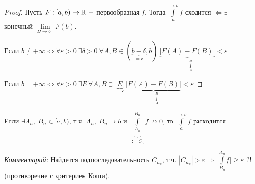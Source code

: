 \begin{proof}
    Пусть $F:[a, b)\rightarrow \mathbb{R}\ -$ первообразная $f$. Тогда $\int\limits_a^{\rightarrow b}f$ сходится $\Leftrightarrow \exists$ конечный $\lim\limits_{B\rightarrow b_-}F(b)$.

    Если $b\neq +\infty \Leftrightarrow \forall \varepsilon >0\ \exists \delta > 0\ \forall A, B\in (\underbrace{b-\delta}_{=c}, b)\ \underbrace{|F(A)-F(B)|}_{=\int\limits_A^B}<\varepsilon$

    Если $b= +\infty \Leftrightarrow \forall \varepsilon >0\ \exists E\ \forall A, B \supset \underbrace{E}_{=c}\ \underbrace{|F(A)-F(B)|}_{=\int\limits_A^B}<\varepsilon$
\end{proof}

\begin{remark}
    Если $\exists A_n,\ B_n\in [a, b)$, т.ч. $A_n,\ B_n\rightarrow b$ и $\underbrace{\int\limits_{A_n}^{B_n}}_{:=C_n}f \not\rightarrow 0$, то $\int\limits_a^{\rightarrow b}f$ расходится.

    \textit{Комментарий:} Найдется подпоследовательность $C_{n_k}$, т.ч. $|C_{n_k}|>\varepsilon\Rightarrow \bigg|\int\limits_{B_n}^{A_n}f\bigg|\geq \varepsilon$ ?! (противоречие с критерием Коши).
\end{remark}

